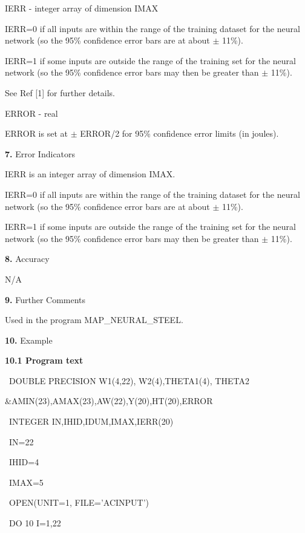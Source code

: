 \medskip
\item {} IERR - integer array of dimension IMAX
\item {} \indent IERR=0 if all inputs are within the range of the training
dataset for the neural network \indent (so the 95\% confidence error bars are at about
$\pm$ 11\%). 
\medskip
\item {} \indent IERR=1 if some inputs are outside the range of the training 
set for the neural network \indent (so the 95\% confidence error bars may then be greater than
$\pm$ 11\%).
\medskip
\item {} \indent See Ref [1] for further details.
\medskip
\item {} ERROR - real
\item {} \indent ERROR is set at $\pm$ ERROR/2 for 95\% confidence error limits (in joules).
\vfill \eject
\item{\bf 7.} {\largeb  Error Indicators}
\bigskip
\item {} IERR is an integer array of dimension IMAX. 
\medskip
\item {} \indent IERR=0 if all inputs are within the range of the training
dataset for the neural network \indent (so the 95\% confidence error bars are at about
$\pm$ 11\%).
\medskip
\item {} \indent IERR=1 if some inputs are outside the range of the training
set for the neural network \indent (so the 95\% confidence error bars may then be greater than
$\pm$ 11\%).
\item{\bf 8.} {\largeb  Accuracy}
\medskip
\item {} N/A
\item{\bf 9.} {\largeb  Further Comments}
\bigskip
\item {} Used in the program MAP\_NEURAL\_STEEL.
\item{\bf 10.} {\largeb  Example}
\bigskip
\item{} {\bf 10.1 Program text}
\bigskip
\item {}       ~DOUBLE PRECISION W1(4,22), W2(4),THETA1(4), THETA2
\item {}    \&AMIN(23),AMAX(23),AW(22),Y(20),HT(20),ERROR
\item {}       ~INTEGER IN,IHID,IDUM,IMAX,IERR(20)
\item {}        ~IN=22
\item {}        ~IHID=4
\item {}        ~IMAX=5
\item {}        ~OPEN(UNIT=1, FILE='ACINPUT')
\item {}        ~DO 10 I=1,22
